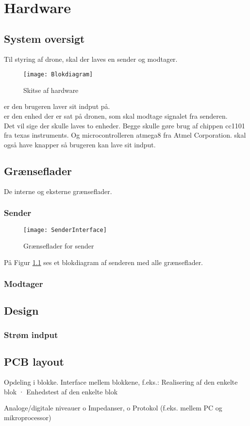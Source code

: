 \documentclass[Main]{subfiles}
\begin{document}
\chapter{Hardware}

\section{System oversigt}

Til styring af drone, skal der laves en sender og modtager.

\begin{figure}[H]
\centering
\texttt{[image: Blokdiagram]}
\caption{Skitse af hardware}
\end{figure}

 er den brugeren laver sit indput på. 
\\  er den enhed der er sat på dronen, som skal modtage signalet fra senderen.\\
Det vil sige der skulle laves to enheder. Begge skulle gøre brug af chippen cc1101 fra texas instruments. Og microcontrolleren atmega8 fra Atmel Corporation.
 skal også have knapper så brugeren kan lave sit indput.

\section{Grænseflader}

De interne og eksterne grænseflader. 

\subsection{Sender}
\begin{figure}[H]
\centering
\texttt{[image: SenderInterface]}
\caption{Grænseflader for sender}
\label{fig: SenderInterface}
\end{figure}

På Figur \ref{fig: SenderInterface} ses et blokdiagram af senderen med alle grænseflader.


\subsection{Modtager}

\itoc

\section{Design}

\subsection{Strøm indput}

\section{PCB layout}



Opdeling i blokke.
Interface mellem blokkene, f.eks.:
Realisering af den enkelte blok
· Enhedstest af den enkelte blok

Analoge/digitale niveauer
o Impedanser,
o Protokol (f.eks. mellem PC og mikroprocessor)
\end{document}
